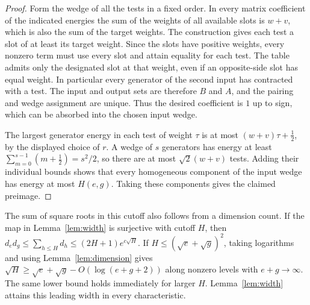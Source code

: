 \begin{proof}
Form the wedge of all the tests in a fixed order. In every matrix
coefficient of the indicated energies the sum of the weights of all
available slots is $w+v$, which is also the sum of the target weights.
The construction gives each test a slot of at least its target weight.
Since the slots have positive weights, every nonzero term must use
every slot and attain equality for each test. The table admits only
the designated slot at that weight, even if an opposite-side slot
has equal weight. In particular every generator of the second input
has contracted with a test. The input and output sets are therefore
$B$ and $A$, and the pairing and wedge assignment are unique. Thus
the desired coefficient is $1$ up to sign, which can be absorbed into the chosen input wedge.

The largest generator energy in each test of weight $\tau$ is at most
$(w+v)\tau+\tfrac12$, by the displayed choice of $r$. A wedge of $s$
generators has energy at least
$\sum_{m=0}^{s-1}(m+\tfrac12)=s^2/2$, so there are at most
$\sqrt2(w+v)$ tests. Adding their individual bounds shows that every
homogeneous component of the input wedge has energy at most $H(e,g)$.
Taking these components gives the claimed preimage.
\end{proof}

The sum of square roots in this cutoff also follows from a dimension count.
If the map in Lemma~\ref{lem:width} is surjective with cutoff $H$, then
$d_e d_g\le \sum_{h\le H}d_h\le (2H+1)e^{c\sqrt H}$.
If $H\le(\sqrt e+\sqrt g)^2$, taking logarithms and
using Lemma~\ref{lem:dimension} gives
$\sqrt H\ge\sqrt e+\sqrt g-O(\log(e+g+2))$ along nonzero levels
with $e+g\to\infty$. The same lower bound holds immediately for larger $H$.
Lemma~\ref{lem:width} attains this leading width in
every characteristic.
